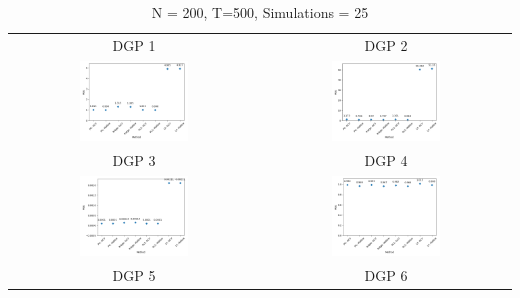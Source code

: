 \begin{table}[h! ]
    \centering
    \caption*{N = 200, T=500, Simulations = 25}
    \begin{tabular}{c c}
    DGP 1 & DGP 2 \\
        \includegraphics[width=0.45\textwidth]{figures/N200_T500_DGP1_Sims25.png} & \includegraphics[width=0.45\textwidth]{figures/N200_T500_DGP2_Sims25.png} \\
        DGP 3 & DGP 4 \\
        \includegraphics[width=0.45\textwidth]{figures/N200_T500_DGP3_Sims25} &
        \includegraphics[width=0.45\textwidth]{figures/N200_T500_DGP4_Sims25} \\
        DGP 5 & DGP 6 \\

\end{tabular}
\end{table}

